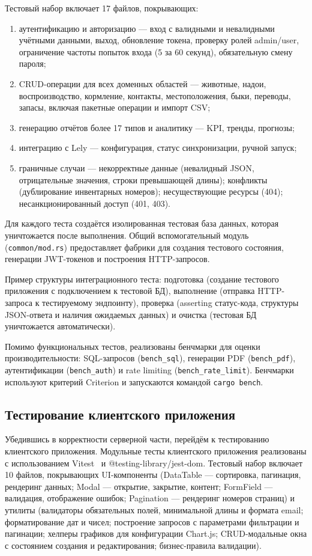 Тестовый набор включает 17 файлов, покрывающих:
\begin{enumerate}
    \item аутентификацию и авторизацию --- вход с валидными и невалидными учётными данными, выход, обновление токена, проверку ролей admin/user, ограничение частоты попыток входа (5 за 60 секунд), обязательную смену пароля;
    \item CRUD-операции для всех доменных областей --- животные, надои, воспроизводство, кормление, контакты, местоположения, быки, переводы, запасы, включая пакетные операции и импорт CSV;
    \item генерацию отчётов более 17 типов и аналитику --- KPI, тренды, прогнозы;
    \item интеграцию с Lely --- конфигурация, статус синхронизации, ручной запуск;
    \item граничные случаи --- некорректные данные (невалидный JSON, отрицательные значения, строки превышающей длины); конфликты (дублирование инвентарных номеров); несуществующие ресурсы (404); несанкционированный доступ (401, 403).
\end{enumerate}

Для каждого теста создаётся изолированная тестовая база данных, которая уничтожается после выполнения. Общий вспомогательный модуль (\texttt{common/mod.rs}) предоставляет фабрики для создания тестового состояния, генерации JWT-токенов и построения HTTP-запросов.

Пример структуры интеграционного теста: подготовка (создание тестового приложения с подключением к тестовой БД), выполнение (отправка HTTP-запроса к тестируемому эндпоинту), проверка (asserting статус-кода, структуры JSON-ответа и наличия ожидаемых данных) и очистка (тестовая БД уничтожается автоматически).

Помимо функциональных тестов, реализованы бенчмарки для оценки производительности: SQL-запросов (\texttt{bench\_sql}), генерации PDF (\texttt{bench\_pdf}), аутентификации (\texttt{bench\_auth}) и rate limiting (\texttt{bench\_rate\_limit}). Бенчмарки используют критерий Criterion и запускаются командой \texttt{cargo bench}.

\subsection{Тестирование клиентского приложения}

Убедившись в корректности серверной части, перейдём к тестированию клиентского приложения. Модульные тесты клиентского приложения реализованы с использованием Vitest~\cite{Vitest} и @testing-library/jest-dom. Тестовый набор включает 10 файлов, покрывающих UI-компоненты (DataTable --- сортировка, пагинация, рендеринг данных; Modal --- открытие, закрытие, контент; FormField --- валидация, отображение ошибок; Pagination --- рендеринг номеров страниц) и утилиты (валидаторы обязательных полей, минимальной длины и формата email; форматирование дат и чисел; построение запросов с параметрами фильтрации и пагинации; хелперы графиков для конфигурации Chart.js; CRUD-модальные окна с состоянием создания и редактирования; бизнес-правила валидации).

